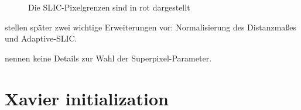 \begin{figure}
    \centering
    \caption{Die SLIC-Pixelgrenzen sind in rot dargestellt }
    \label{fig:slic_parameters}
\end{figure}

\citeauthor{AchantaSLICSuperpixelsCompared2012} stellen später zwei wichtige Erweiterungen vor:
Normalisierung des Distanzmaßes und Adaptive-SLIC.

\citeauthor{ChenConvolutionalNeuralNetworks2017a} nennen keine Details zur Wahl
der Superpixel-Parameter.

\section{Xavier initialization}


